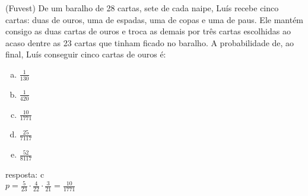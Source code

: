\begin{ex}
 (Fuvest) De um baralho de 28 cartas, sete de cada naipe, Luís recebe cinco cartas: duas de ouros, uma de espadas, uma de copas e uma de paus. Ele mantém consigo as duas cartas de ouros e troca as demais por três cartas escolhidas ao acaso dentre as 23 cartas que tinham ficado no baralho. A probabilidade de, ao final, Luís conseguir cinco cartas de ouros é:
   \begin{enumerate}  [(a)]
       \item $\frac{1}{130}$
       \item $\frac{1}{420}$
       \item $\frac{10}{1771}$
       \item $\frac{25}{7117}$
       \item $\frac{52}{8117}$
   \end{enumerate}
     \begin{sol}
      resposta: c \\
      $p=\frac{5}{23}\cdot\frac{4}{22}\cdot\frac{3}{21}=\frac{10}{1771}$
     \end{sol}
 \end{ex}